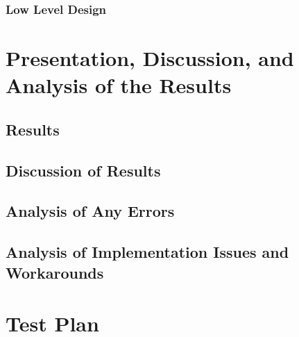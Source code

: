 \documentclass[12pt]{article} %
\begin{document}
\subsubsection{Low Level Design\label{swLowLevel}} %
%

\section{Presentation, Discussion, and Analysis of the Results}
%
%
\subsection{Results } %

\subsection{Discussion of Results } %

\subsection{Analysis of Any Errors } %
%

\subsection{Analysis of Implementation Issues and Workarounds} %
%
%

\section{Test Plan } %
%
\end{document}
